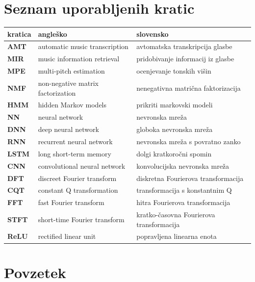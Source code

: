\documentclass[a4paper, 12pt, openright]{book}
\newcommand{\clearemptydoublepage}{\newpage{\pagestyle{empty}\cleardoublepage}}
\begin{document}
\chapter*{Seznam uporabljenih kratic}

\noindent\begin{tabular}{p{}|p{}|p{}} %
  {\bf kratica} & {\bf angleško} & {\bf slovensko} \\
  \hline
  \textbf{AMT} & automatic music transcription & avtomatska transkripcija glasbe \\
  \textbf{MIR} & music information retrieval & pridobivanje informacij iz glasbe \\
  \textbf{MPE} & multi-pitch estimation & ocenjevanje tonskih višin \\
  \textbf{NMF} & non-negative matrix factorization & nenegativna matrična faktorizacija \\
  \textbf{HMM} & hidden Markov models & prikriti markovski modeli \\
  \textbf{NN} & neural network & nevronska mreža \\
  \textbf{DNN} & deep neural network & globoka nevronska mreža \\
  \textbf{RNN} & recurrent neural network & nevronska mreža s povratno zanko \\
  \textbf{LSTM} & long short-term memory & dolgi kratkoročni spomin \\
  \textbf{CNN} & convolutional neural network & konvolucijska nevronska mre\-ža \\
  \textbf{DFT} & discreet Fourier transform & diskretna Fourierova transformacija \\
  \textbf{CQT} & constant Q transformation & transformacija s konstantnim Q \\
  \textbf{FFT} & fast Fourier transform & hitra Fourierova transformacija \\
  \textbf{STFT} & short-time Fourier transform & kratko-časovna Fourierova transformacija \\
  \textbf{ReLU} & rectified linear unit & popravljena linearna enota \\
\end{tabular}


\clearemptydoublepage


\chapter*{Povzetek}
\end{document}
